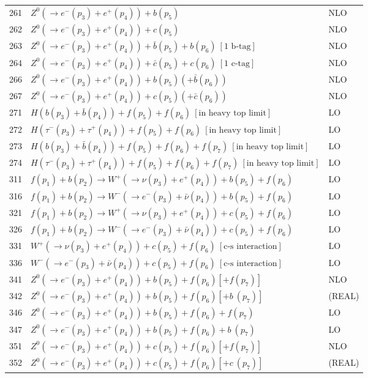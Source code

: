 \documentclass[12pt]{article}
\begin{document}
\begin{itemize}
\begin{table}
\begin{center}
\begin{tabular}{|l|l|l|}
261& $ Z^0(\to e^-(p_3)+e^+(p_4))+b(p_5) $ & NLO \\
262& $ Z^0(\to e^-(p_3)+e^+(p_4))+c(p_5) $ & NLO \\
263& $ Z^0(\to e^-(p_3)+e^+(p_4))+\bar{b}(p_5)+b(p_6) ~[ \mbox{1 b-tag} ] $ & NLO \\
264& $ Z^0(\to e^-(p_3)+e^+(p_4))+\bar{c}(p_5)+c(p_6) ~[ \mbox{1 c-tag} ] $ & NLO \\
266& $ Z^0(\to e^-(p_3)+e^+(p_4))+b(p_5)(+\bar{b}(p_6)) $ & NLO \\
267& $ Z^0(\to e^-(p_3)+e^+(p_4))+c(p_5)(+\bar{c}(p_6)) $ & NLO \\
\hline 
271& $ H(b(p_3)+\bar{b}(p_4))+f(p_5)+f(p_6)~[ \mbox{in heavy top limit} ] $ & LO \\
272& $ H(\tau^-(p_3)+\tau^+(p_4))+f(p_5)+f(p_6)~[ \mbox{in heavy top limit} ] $ & LO \\
273& $ H(b(p_3)+\bar{b}(p_4))+f(p_5)+f(p_6)+f(p_7)~[ \mbox{in heavy top limit} ] $ & LO \\
274& $ H(\tau^-(p_3)+\tau^+(p_4))+f(p_5)+f(p_6)+f(p_7)~[ \mbox{in heavy top limit} ] $ & LO \\
\hline 
311& $  f(p_1)+b(p_2) \to  W^+(\to \nu(p_3)+e^+(p_4))+b(p_5)+f(p_6) $ & LO \\
316& $  f(p_1)+b(p_2) \to  W^-(\to e^-(p_3)+\bar{\nu}(p_4))+b(p_5)+f(p_6) $ & LO \\
\hline 
321& $  f(p_1)+b(p_2) \to  W^+(\to \nu(p_3)+e^+(p_4))+c(p_5)+f(p_6) $ & LO \\
326& $  f(p_1)+b(p_2) \to  W^-(\to e^-(p_3)+\bar{\nu}(p_4))+c(p_5)+f(p_6) $ & LO \\
\hline 
331& $ W^+(\to \nu(p_3)+e^+(p_4))+c(p_5)+f(p_6) ~[ \mbox{c-s interaction} ] $ & LO \\
336& $ W^-(\to e^-(p_3)+\bar{\nu}(p_4))+c(p_5)+f(p_6) ~[ \mbox{c-s interaction} ] $ & LO \\
\hline 
341& $ Z^0(\to e^-(p_3)+e^+(p_4))+b(p_5)+f(p_6) [+f(p_7)]$ & NLO \\
342& $ Z^0(\to e^-(p_3)+e^+(p_4))+b(p_5)+f(p_6) [+b~(p_7)]$ & (REAL) \\
346& $ Z^0(\to e^-(p_3)+e^+(p_4))+b(p_5)+f(p_6)+f(p_7)$ & LO \\
347& $ Z^0(\to e^-(p_3)+e^+(p_4))+b(p_5)+f(p_6)+b~(p_7)$ & LO \\
\hline 
351& $ Z^0(\to e^-(p_3)+e^+(p_4))+c(p_5)+f(p_6) [+f(p_7)]$ & NLO \\
352& $ Z^0(\to e^-(p_3)+e^+(p_4))+c(p_5)+f(p_6) [+c~(p_7)]$ & (REAL) \\

\end{tabular}
\end{center}
\end{table}
\end{itemize}
\end{document}
